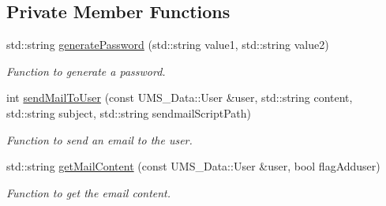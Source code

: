 \subsection*{Private Member Functions}
\begin{DoxyCompactItemize}
\item 
std::string \hyperlink{classUserServer_a61f17775588f641c30035349e5e8bfef}{generatePassword} (std::string value1, std::string value2)
\begin{DoxyCompactList}\small\item\em Function to generate a password. \item\end{DoxyCompactList}\item 
int \hyperlink{classUserServer_ac4e5db25963346be0bc57f5b61a1ad59}{sendMailToUser} (const UMS\_\-Data::User \&user, std::string content, std::string subject, std::string sendmailScriptPath)
\begin{DoxyCompactList}\small\item\em Function to send an email to the user. \item\end{DoxyCompactList}\item 
std::string \hyperlink{classUserServer_a4896a5d7bd51b8ad24cf6864ba400487}{getMailContent} (const UMS\_\-Data::User \&user, bool flagAdduser)
\begin{DoxyCompactList}\small\item\em Function to get the email content. \item\end{DoxyCompactList}\end{DoxyCompactItemize}
